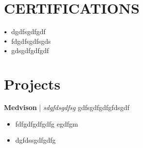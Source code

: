 \documentclass[letterpaper,11pt]{article}
\newcommand\sbullet[1][.5]{\mathbin{\vcenter{\hbox{\scalebox{#1}{$\bullet$}}}}}
\begin{document}
%     

\section{CERTIFICATIONS}
$\sbullet[.75] \hspace{0.1cm}$ dgdfsgdfgdf \\
$\sbullet[.75] \hspace{0.1cm}$ fdgdfsgdfsgds \\
$\sbullet[.75] \hspace{0.1cm}$ gdsgdfgdfgdf \\

\section*{Projects}
\textbf{Medvison} \href{gdfsgfdsgfds}{\faExternalLink} | \textit{sdgfdsgdfsg} \hfill gdfsgdfgdfgfdsgdf \\[2pt]
\begin{itemize}[leftmargin=*]
\item fdfgdfgdfgdfg egdfgm
\item dgfdssgdfgdfg
\end{itemize}
\end{document}
